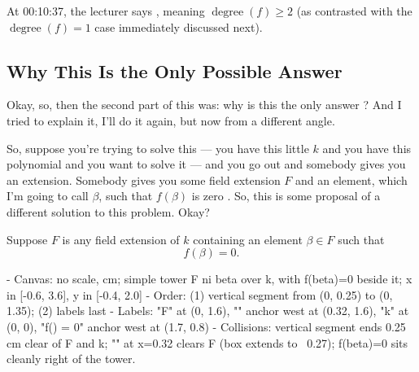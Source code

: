 \begin{aiNote}
At 00:10:37, the lecturer says , meaning $\operatorname{degree}(f) \ge 2$ (as contrasted with the $\operatorname{degree}(f) = 1$ case immediately discussed next).
\end{aiNote}

\subsection{Why This Is the Only Possible Answer}

\begin{speech}[00:11:43 - 00:12:34]
Okay, so, then the second part of this was: why is this the only answer ? And I tried to explain it, I'll do it again, but now from a different angle.

So, suppose you're trying to solve this --- you have this little $k$  and you have this polynomial and you want to solve it --- and you go out and somebody gives you an extension. Somebody gives you some field extension $F$  and an element, which I'm going to call $\beta$, such that $f(\beta)$ is zero . So, this is some proposal of a different solution to this problem. Okay?
\end{speech}

\begin{content}
Suppose $F$ is any field extension of $k$ containing an element $\beta \in F$ such that
\[
f(\beta) = 0.
\]
\begin{hidden}
- Canvas: no scale, cm; simple tower F ni beta over k, with f(beta)=0 beside it; x in [-0.6, 3.6], y in [-0.4, 2.0]
- Order: (1) vertical segment from (0, 0.25) to (0, 1.35); (2) labels last
- Labels: "F" at (0, 1.6), "\ni \beta" anchor west at (0.32, 1.6), "k" at (0, 0), "f(\beta) = 0" anchor west at (1.7, 0.8)
- Collisions: vertical segment ends 0.25 cm clear of F and k; "\ni \beta" at x=0.32 clears F (box extends to ~0.27); f(beta)=0 sits cleanly right of the tower.
\end{hidden}
\begin{center}
\end{center}
\end{content}


